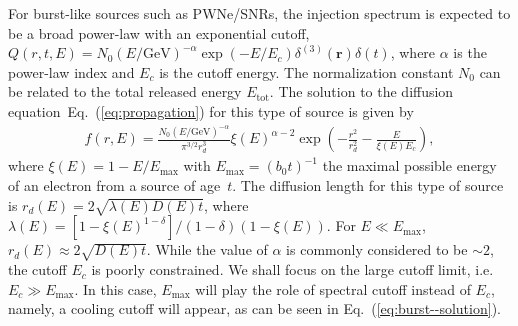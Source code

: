 \documentclass[aps,prl,twocolumn,a4paper]{revtex4}
\newcommand{\eq}[1]{Eq.~(\ref{#1})}
\newcommand{\tx}[1]{\text{#1}}
\begin{document}
For burst-like sources such as PWNe/SNRs,  
the injection spectrum is expected to be
a broad power-law with an exponential cutoff,
$Q(r,t,E)=N_{0} (E/\mbox{GeV})^{-\alpha} 
\exp(-E/E_{c}) \delta^{(3)}(\mathbf{r})\delta(t)$, 
where $\alpha$ is the power-law index and
$E_{c}$ is the cutoff energy.
The normalization constant $N_{0}$ can be  related to 
the total released energy  $E_{\tx{tot}}$.
The solution to the diffusion equation~\eq{eq:propagation} 
for this type of source is given by~\cite{Atoian:1995ux}
\begin{align}\label{eq:burst--solution}
f(r,E)=\frac{N_{0}
	(E/\text{GeV})^{-\alpha}}{\pi^{3/2}r_{d}^{3}} 
\xi(E)^{\alpha-2}
\exp\left(-\frac{r^{2}}{r_{d}^{2}}-\frac{E}{\xi(E) E_{c}}\right) ,
\end{align}
where $\xi(E)=1-E/E_{\text{max}}$ 
with $E_{\text{max}}=(b_{0}t)^{-1}$  the maximal possible energy of 
an electron from a source of age~$t$.
The diffusion length for this type of source is
$r_{d}(E) =2\sqrt{ \lambda(E) D(E)t}$,
where $\lambda(E)=[1-\xi(E)^{1-\delta}]/(1-\delta)(1-\xi(E))$.
For $E\ll E_{\text{max}}$, $r_{d}(E) \approx 2\sqrt{D(E)t}$.
While the value of $\alpha$ is commonly considered to be $\sim 2$,
the cutoff $E_{c}$ is poorly constrained.
We shall focus on the large cutoff limit, 
i.e. $E_{c}\gg E_{\text{max}}$.
In this case,
$E_{\text{max}}$ will play the role of spectral cutoff 
instead of $E_{c}$, namely,
a cooling cutoff will appear,
as can be seen in \eq{eq:burst--solution}.
\end{document}
